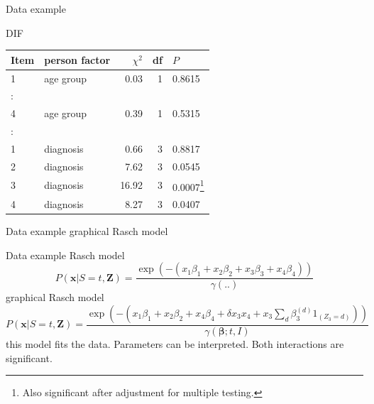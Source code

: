 \documentclass[xcolor=table]{beamer}
\begin{document}
\begin{frame}{Data example}
\begin{block}{DIF}
\begin{tabular}{llrrl}
\hline
Item & person factor & $\chi^2$ & df & $P$  \\
\hline 
1 & age group & 0.03 & 1 & 0.8615 \\
:\\
4 & age group & 0.39 & 1 & 0.5315 \\
\hline 
:\\
\hline 
1 & diagnosis & 0.66 & 3 & 0.8817 \\
2 & diagnosis & 7.62 & 3 & 0.0545 \\
3 & diagnosis &16.92 & 3 & 0.0007\footnote{Also significant after adjustment for multiple testing.} \\
4 & diagnosis & 8.27 & 3 & 0.0407 \\
\hline
\end{tabular}
\end{block}

\end{frame}

\begin{frame}{Data example}
graphical Rasch model
\end{frame}

\begin{frame}{Data example}
Rasch model
$$
P(\boldsymbol{x}|S=t,\boldsymbol{Z})=
\frac{\exp(-(x_1\beta_1+x_2\beta_2+x_3\beta_3+x_4\beta_4))}
{\gamma(..)}
$$
graphical Rasch model
$$
P(\boldsymbol{x}|S=t,\boldsymbol{Z})=
\frac{\exp\left(-(x_1\beta_1+x_2\beta_2+x_4\beta_4+\delta x_3x_4+x_3\sum_d\beta_3^{(d)}1_{(Z_3=d)})\right)}
{\gamma(\boldsymbol{\beta};t,I)}
$$
this model fits the data. Parameters can be interpreted. Both interactions are significant.


\end{frame}
\end{document}
